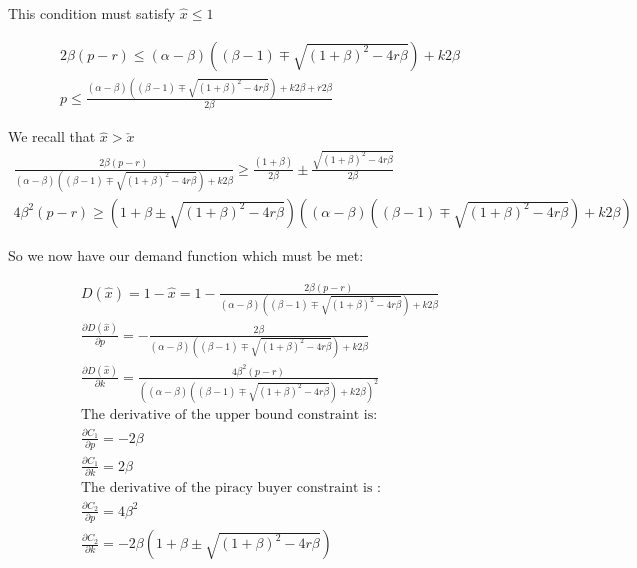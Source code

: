 \documentclass{article}
\begin{document}
This condition must satisfy $\hat{x} \leq 1$

\begin{align*}
2 \beta (p-r) 
\leq 
(\alpha-\beta) 
\left( 
(\beta-1) \mp \sqrt{ \left(1+\beta\right)^2 -4r\beta } 
\right)+k2\beta \\
p
\leq 
\frac{(\alpha-\beta) 
\left( 
(\beta-1) \mp \sqrt{ \left(1+\beta\right)^2 -4r\beta } 
\right)+k2\beta+r2\beta}{2\beta}
\end{align*}

We recall that $\hat{x}>\check{x}$
\begin{align*}
\frac{2\beta (p-r)}{(\alpha-\beta) 
\left( 
(\beta-1) \mp \sqrt{ \left(1+\beta\right)^2 -4r\beta } 
\right)+k2\beta}
\geq 
\frac{(1+\beta)}{2 \beta}
\pm
\frac{ \sqrt{ \left(1+\beta\right)^2 -4r\beta } }{2 \beta} \\
4\beta^2 (p-r)
\geq 
\left( 1+\beta
\pm
\sqrt{ \left(1+\beta\right)^2 -4r\beta } 
\right)
\left(
(\alpha-\beta) 
\left( 
(\beta-1) \mp \sqrt{ \left(1+\beta\right)^2 -4r\beta } 
\right)+k2\beta
\right)
\end{align*}

So we now have our demand function which must be met: 

\begin{align*}
D(\hat{x})=1-\hat{x}=1-\frac{2\beta (p-r)}{(\alpha-\beta) 
\left( 
(\beta-1) \mp \sqrt{ \left(1+\beta\right)^2 -4r\beta } 
\right)+k2\beta} \\
\frac{\partial D(\hat{x})}{\partial p} =
-\frac{2\beta }{(\alpha-\beta) 
\left( 
(\beta-1) \mp \sqrt{ \left(1+\beta\right)^2 -4r\beta } 
\right)+k2\beta} \\
\frac{\partial D(\hat{x})}{\partial k} =
\frac{4 \beta^2(p-r) }{((\alpha-\beta) 
\left( 
(\beta-1) \mp \sqrt{ \left(1+\beta\right)^2 -4r\beta } 
\right)+k2\beta)^2} \\
\text{The derivative of the upper bound constraint is:} \\
\frac{\partial C_1}{\partial p} = - 2 \beta \\
\frac{\partial C_1}{\partial k} = 2\beta \\
\text{The derivative of the piracy buyer constraint is :}\\
\frac{\partial C_2}{\partial p} = 4 \beta^2 \\
\frac{\partial C_2}{\partial k} = -2 \beta \left( 1+\beta
\pm
\sqrt{ \left(1+\beta\right)^2 -4r\beta } 
\right) \\
\end{align*}
\end{document}
